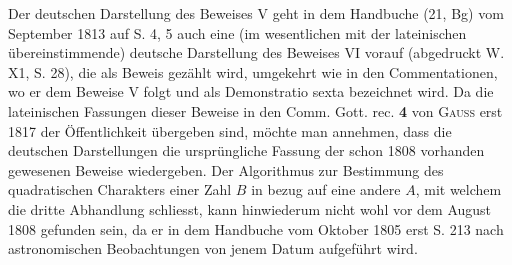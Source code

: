 Der deutschen Darstellung des Beweises V geht in dem Handbuche (21, Bg) vom September 1813 auf S. 4, 5 auch eine (im wesentlichen mit der lateinischen übereinstimmende) deutsche Darstellung des Beweises VI vorauf (abgedruckt W. X1, S. 28), die als  Beweis gezählt wird, umgekehrt wie in den Commentationen, wo er dem Beweise V folgt und als Demonstratio sexta bezeichnet wird. Da die lateinischen Fassungen dieser Beweise in den Comm. Gott. rec. \textbf{4} von \textsc{Gauss} erst 1817 der Öffentlichkeit übergeben
\newpage{}
\noindent sind, möchte man annehmen, dass die deutschen Darstellungen die ursprüngliche Fassung der schon 1808 vorhanden gewesenen Beweise wiedergeben. Der Algorithmus zur Bestimmung des quadratischen Charakters einer Zahl \(B\) in bezug auf eine andere \(A\), mit welchem die dritte Abhandlung schliesst, kann hinwiederum nicht wohl vor dem August 1808 gefunden sein, da er in dem Handbuche vom Oktober 1805 erst S. 213 nach astronomischen Beobachtungen von jenem Datum aufgeführt wird.
